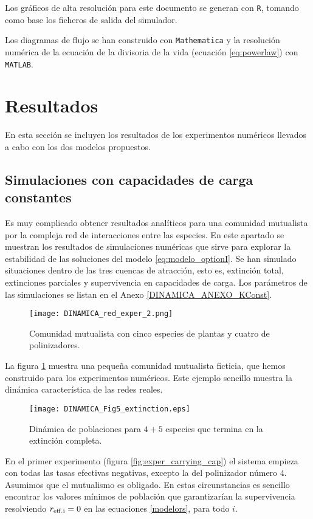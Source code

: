 Los gráficos de alta resolución para este documento se generan con \texttt{R}, tomando como base los ficheros de salida del simulador. 

Los diagramas de flujo se han construido con \texttt{Mathematica} y la resolución numérica de la ecuación de la divisoria de la vida (ecuación \ref{eq:powerlaw}) con \texttt{MATLAB}.

\section{Resultados}

En esta sección se incluyen los resultados de los experimentos numéricos llevados a cabo con los dos modelos propuestos.

\subsection{Simulaciones con capacidades de carga constantes}
\label{results_K_constante}
Es muy complicado obtener resultados analíticos para una comunidad mutualista por la compleja red de interacciones entre las especies. En este apartado se muestran los resultados de simulaciones numéricas que sirve para explorar la estabilidad de las soluciones del modelo \ref{eq:modelo_optionI}. Se han simulado situaciones dentro de las tres cuencas de atracción, esto es, extinción total, extinciones parciales y supervivencia en capacidades de carga. Los parámetros de las simulaciones se listan en el Anexo \ref{DINAMICA_ANEXO_KConst}.

\begin{figure}[h!]
\centering
\texttt{[image: DINAMICA\_red\_exper\_2.png]}
\caption {Comunidad mutualista con cinco especies de plantas y cuatro de polinizadores.}
\label{fig:red_exper_stab1}
\end{figure}

La figura \ref{fig:red_exper_stab1} muestra una pequeña comunidad mutualista ficticia, que hemos construido para los experimentos numéricos. Este ejemplo sencillo muestra la dinámica característica de las redes reales.

\begin{figure}[ht!]
\centering
\texttt{[image: DINAMICA\_Fig5\_extinction.eps]}
\caption {Dinámica de poblaciones para $4+5$ especies que termina en la extinción completa.}
\label{fig:exper_stab1}
\end{figure}

En el primer experimento (figura \ref{fig:exper_carrying_cap}) el sistema empieza con todas las tasas efectivas negativas, excepto la del polinizador número $4$. Asumimos que el mutualismo es obligado. En estas circunstancias es sencillo encontrar los valores mínimos de población que garantizarían la supervivencia resolviendo $r_{\rm{eff}.i} = 0$ en las ecuaciones \ref{modelors}, para todo $i$.

